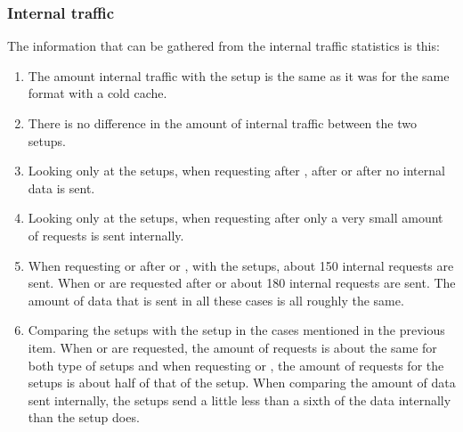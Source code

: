 \documentclass[twoside,openright]{uva-bachelor-thesis}
\begin{document}
\subsubsection{Internal traffic}
The information that can be gathered from the internal traffic statistics is
this:
\begin{enumerate}
    \item
        The amount internal traffic with the \cdn setup is the same as it was
        for the same format with a cold cache.

    \item
        There is no difference in the amount of internal traffic between the
        two \lt setups.

    \item
        Looking only at the \lt setups, when requesting \dash after \iss, \iss
        after \dash or \hds after \hls no internal data is sent.

    \item Looking only at the \lt setups, when requesting \hls after \hds only a
        very small amount of requests is sent internally.

    \item When requesting \hds or \hls after \dash or \iss, with the \lt setups,
        about 150 internal requests are sent. When \dash or \iss are requested
        after \hds or \hls about 180 internal requests are sent.  The amount of
        data that is sent in all these cases is all roughly the same.

    \item
        Comparing the \lt setups with the \cdn setup in the cases mentioned in
        the previous item. When \hds or \hls are requested, the amount of
        requests is about the same for both type of setups and when requesting
        \dash or \iss, the amount of requests for the \lt setups is about half
        of that of the \cdn setup. When comparing the amount of data sent
        internally, the \lt setups send a little less than a sixth of the data
        internally than the \cdn setup does.

\end{enumerate}






\FloatBarrier





\end{document}

